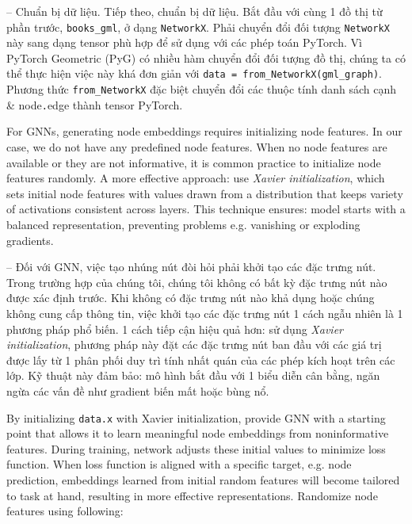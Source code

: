 \documentclass{article}
\begin{document}
\begin{itemize}
\begin{itemize}
\begin{itemize}
\begin{itemize}
               -- {\sf Chuẩn bị dữ liệu.} Tiếp theo, chuẩn bị dữ liệu. Bắt đầu với cùng 1 đồ thị từ phần trước, \verb|books_gml|, ở dạng {\tt NetworkX}. Phải chuyển đổi đối tượng {\tt NetworkX} này sang dạng tensor phù hợp để sử dụng với các phép toán PyTorch. Vì PyTorch Geometric (PyG) có nhiều hàm chuyển đổi đối tượng đồ thị, chúng ta có thể thực hiện việc này khá đơn giản với \verb|data = from_NetworkX(gml_graph)|. Phương thức \verb|from_NetworkX| đặc biệt chuyển đổi các thuộc tính danh sách cạnh \& node{\tt.}edge thành tensor PyTorch.

               For GNNs, generating node embeddings requires initializing node features. In our case, we do not have any predefined node features. When no node features are available or they are not informative, it is common practice to initialize node features randomly. A more effective approach: use {\it Xavier initialization}, which sets initial node features with values drawn from a distribution that keeps variety of activations consistent across layers. This technique ensures: model starts with a balanced representation, preventing problems e.g. vanishing or exploding gradients.

               -- Đối với GNN, việc tạo nhúng nút đòi hỏi phải khởi tạo các đặc trưng nút. Trong trường hợp của chúng tôi, chúng tôi không có bất kỳ đặc trưng nút nào được xác định trước. Khi không có đặc trưng nút nào khả dụng hoặc chúng không cung cấp thông tin, việc khởi tạo các đặc trưng nút 1 cách ngẫu nhiên là 1 phương pháp phổ biến. 1 cách tiếp cận hiệu quả hơn: sử dụng {\it Xavier initialization}, phương pháp này đặt các đặc trưng nút ban đầu với các giá trị được lấy từ 1 phân phối duy trì tính nhất quán của các phép kích hoạt trên các lớp. Kỹ thuật này đảm bảo: mô hình bắt đầu với 1 biểu diễn cân bằng, ngăn ngừa các vấn đề như gradient biến mất hoặc bùng nổ.

               By initializing {\tt data.x} with Xavier initialization, provide GNN with a starting point that allows it to learn meaningful node embeddings from noninformative features. During training, network adjusts these initial values to minimize loss function. When loss function is aligned with a specific target, e.g. node prediction, embeddings learned from initial random features will become tailored to task at hand, resulting in more effective representations. Randomize node features using following:


\end{itemize}
\end{itemize}
\end{itemize}
\end{itemize}
\end{document}
